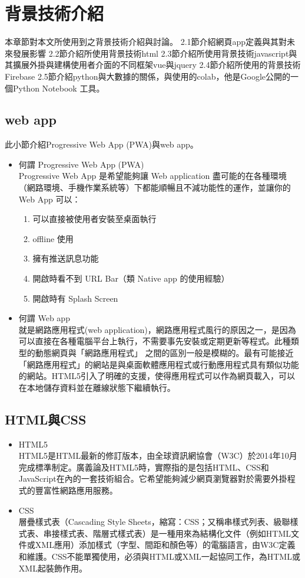 \chapter{背景技術介紹}
本章節對本文所使用到之背景技術介紹與討論。
2.1節介紹網頁app定義與其對未來發展影響
2.2節介紹所使用背景技術html
2.3節介紹所使用背景技術javascript與其擴展外掛與建構使用者介面的不同框架vue與jquery
2.4節介紹所使用的背景技術Firebase
2.5節介紹python與大數據的關係，與使用的colab，他是Google公開的一個Python Notebook 工具。 
\section{web app} 
此小節介紹Progressive Web App (PWA)與web app。
\begin{itemize}
	\item 何謂 Progressive Web App (PWA)\\
	Progressive Web App 是希望能夠讓 Web application 盡可能的在各種環境（網路環境、手機作業系統等）下都能順暢且不減功能性的運作，並讓你的 Web App 可以：
	\begin{enumerate}[1.]
		\item 可以直接被使用者安裝至桌面執行
		\item offline 使用
		\item 擁有推送訊息功能
		\item 開啟時看不到 URL Bar（類 Native app 的使用經驗）
		\item 開啟時有 Splash Screen \cite{name7}
	\end{enumerate}
	\item 何謂 Web app\\
	就是網路應用程式(web application)，網路應用程式風行的原因之一，是因為可以直接在各種電腦平台上執行，不需要事先安裝或定期更新等程式。此種類型的動態網頁與「網路應用程式」 之間的區別一般是模糊的。最有可能接近「網路應用程式」的網站是與桌面軟體應用程式或行動應用程式具有類似功能的網站。HTML5引入了明確的支援，使得應用程式可以作為網頁載入，可以在本地儲存資料並在離線狀態下繼續執行。\cite{name8}
\end{itemize}

\section{HTML與CSS}
\begin{itemize}
\item HTML5\\
HTML5是HTML最新的修訂版本，由全球資訊網協會（W3C）於2014年10月完成標準制定。廣義論及HTML5時，實際指的是包括HTML、CSS和JavaScript在內的一套技術組合。它希望能夠減少網頁瀏覽器對於需要外掛程式的豐富性網路應用服務。\cite{name9}
\item CSS\\
層疊樣式表（Cascading Style Sheets，縮寫：CSS；又稱串樣式列表、級聯樣式表、串接樣式表、階層式樣式表）是一種用來為結構化文件（例如HTML文件或XML應用）添加樣式（字型、間距和顏色等）的電腦語言，由W3C定義和維護。CSS不能單獨使用，必須與HTML或XML一起協同工作，為HTML或XML起裝飾作用。\cite{name10}
\end{itemize}

